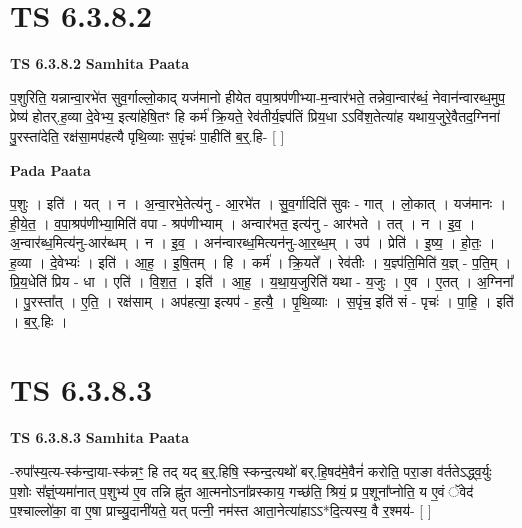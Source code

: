 \documentclass[17pt]{extarticle}
\begin{document}

\section{ TS 6.3.8.2 }

\textbf{TS 6.3.8.2 } \newline
\textbf{Samhita Paata} \newline

प॒शुरिति॒ यन्नान्वा॒रभे॑त सुव॒र्गाल्लो॒काद् यज॑मानो हीयेत वपा॒श्रप॑णीभ्या-म॒न्वार॑भते॒ तन्नेवा॒न्वार॑ब्धं॒ नेवान॑न्वारब्ध॒मुप॒ प्रेष्य॑ होतर्.ह॒व्या दे॒वेभ्य॒ इत्या॑हेषि॒तꣳ हि कर्म॑ क्रि॒यते॒ रेव॑तीर्य॒ज्ञ्प॑तिं प्रिय॒धा ऽऽवि॑श॒तेत्या॑ह यथाय॒जुरे॒वैतद॒ग्निना॑ पु॒रस्ता॑देति॒ रक्ष॑सा॒मप॑हत्यै पृथि॒व्याः स॒पृंचः॑ पा॒हीति॑ ब॒र्॒.हि- [  ] \newline

\textbf{Pada Paata} \newline

प॒शुः । इति॑ । यत् । न । अ॒न्वा॒रभे॒तेत्य॑नु - आ॒रभे॑त । सु॒व॒र्गादिति॑ सुवः - गात् । लो॒कात् । यज॑मानः । ही॒ये॒त॒ । व॒पा॒श्रप॑णीभ्या॒मिति॑ वपा - श्रप॑णीभ्याम् । अन्वार॑भत॒ इत्य॑नु - आर॑भते । तत् । न । इ॒व॒ । अ॒न्वार॑ब्ध॒मित्य॑नु-आर॑ब्धम् । न । इ॒व॒ । अन॑न्वारब्ध॒मित्यन॑नु-आ॒र॒ब्ध॒म् । उप॑ । प्रेति॑ । इ॒ष्य॒ । हो॒तः॒ । ह॒व्या । दे॒वेभ्यः॑ । इति॑ । आ॒ह॒ । इ॒षि॒तम् । हि । कर्म॑ । क्रि॒यते᳚ । रेव॑तीः । य॒ज्ञ्प॑ति॒मिति॑ य॒ज्ञ् - प॒ति॒म् । प्रि॒य॒धेति॑ प्रिय - धा । एति॑ । वि॒श॒त॒ । इति॑ । आ॒ह॒ । य॒था॒य॒जुरिति॑ यथा - य॒जुः । ए॒व । ए॒तत् । अ॒ग्निना᳚ । पु॒रस्ता᳚त् । ए॒ति॒ । रक्ष॑साम् । अप॑हत्या॒ इत्यप॑ - ह॒त्यै॒ । पृ॒थि॒व्याः । स॒पृंच॒ इति॑ सं - पृचः॑ । पा॒हि॒ । इति॑ । ब॒र्॒.हिः ।  \newline





\section{ TS 6.3.8.3 }

\textbf{TS 6.3.8.3 } \newline
\textbf{Samhita Paata} \newline

-रुपा᳚स्य॒त्य-स्क॑न्दा॒या-स्क॑न्नꣳ॒॒ हि तद् यद् ब॒र्॒.हिषि॒ स्कन्द॒त्यथो॑ बर्.हि॒षद॑मे॒वैनं॑ करोति॒ परा॒ङा व॑र्ततेऽद्ध्व॒र्युः प॒शोः स᳚ज्ञ्ं॒प्यमा॑नात् प॒शुभ्य॑ ए॒व तन्नि ह्नु॑त आ॒त्मनोऽना᳚व्रस्काय॒ गच्छ॑ति॒ श्रियं॒ प्र प॒शूना᳚प्नोति॒ य ए॒वं ॅवेद॑ प॒श्चाल्लो॑का॒ वा ए॒षा प्राच्यु॒दानी॑यते॒ यत् पत्नी॒ नम॑स्त आता॒नेत्या॑हाऽऽ*दि॒त्यस्य॒ वै र॒श्मय॑- [  ] \newline
\end{document}
